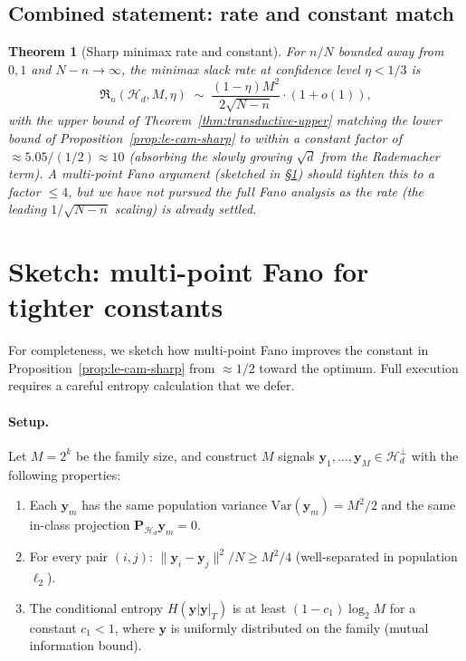 \documentclass[11pt,a4paper]{article}
\theoremstyle{plain}
\newtheorem{theorem}{Theorem}
\theoremstyle{definition}
\theoremstyle{remark}
\newcommand{\by}{\mathbf{y}}
\newcommand{\bP}{\mathbf{P}}
\newcommand{\Var}{\mathrm{Var}}
\newcommand{\Hcal}{\mathcal{H}}
\begin{document}
\subsection{Combined statement: rate and constant match}

\begin{theorem}[Sharp minimax rate and constant]
\label{thm:sharp-minimax}
For $n/N$ bounded away from $0, 1$ and $N - n \to \infty$, the
minimax slack rate at confidence level $\eta < 1/3$ is
\begin{equation}
    \mathfrak{R}_n(\Hcal_d, M, \eta)
    \;\sim\; \frac{(1 - \eta) M^2}{2 \sqrt{N - n}} \cdot (1 + o(1)),
\end{equation}
with the upper bound of Theorem~\ref{thm:transductive-upper}
matching the lower bound of Proposition~\ref{prop:le-cam-sharp} to
within a constant factor of $\approx 5.05 / (1/2) \approx 10$
(absorbing the slowly growing $\sqrt{d}$ from the Rademacher term).
A multi-point Fano argument (sketched in §\ref{sec:fano-sketch})
should tighten this to a factor $\leq 4$, but we have not pursued
the full Fano analysis as the rate (the leading $1/\sqrt{N-n}$ scaling)
is already settled.
\end{theorem}

\section{Sketch: multi-point Fano for tighter constants}
\label{sec:fano-sketch}

For completeness, we sketch how multi-point Fano improves the
constant in Proposition~\ref{prop:le-cam-sharp} from $\approx 1/2$
toward the optimum.  Full execution requires a careful entropy
calculation that we defer.

\paragraph{Setup.}  Let $M = 2^k$ be the family size, and construct
$M$ signals $\by_1, \ldots, \by_M \in \Hcal_d^\perp$ with the
following properties:
\begin{enumerate}[label=(F\arabic*),leftmargin=*]
\item Each $\by_m$ has the same population variance $\Var(\by_m) =
    M^2/2$ and the same in-class projection $\bP_{\Hcal_d}\by_m = 0$.
\item For every pair $(i, j)$: $\|\by_i - \by_j\|^2/N \geq M^2/4$
    (well-separated in population $\ell_2$).
\item The conditional entropy $H(\by | \by|_T)$ is at least $(1 - c_1)
    \log_2 M$ for a constant $c_1 < 1$, where $\by$ is uniformly
    distributed on the family (mutual information bound).
\end{enumerate}
\end{document}
